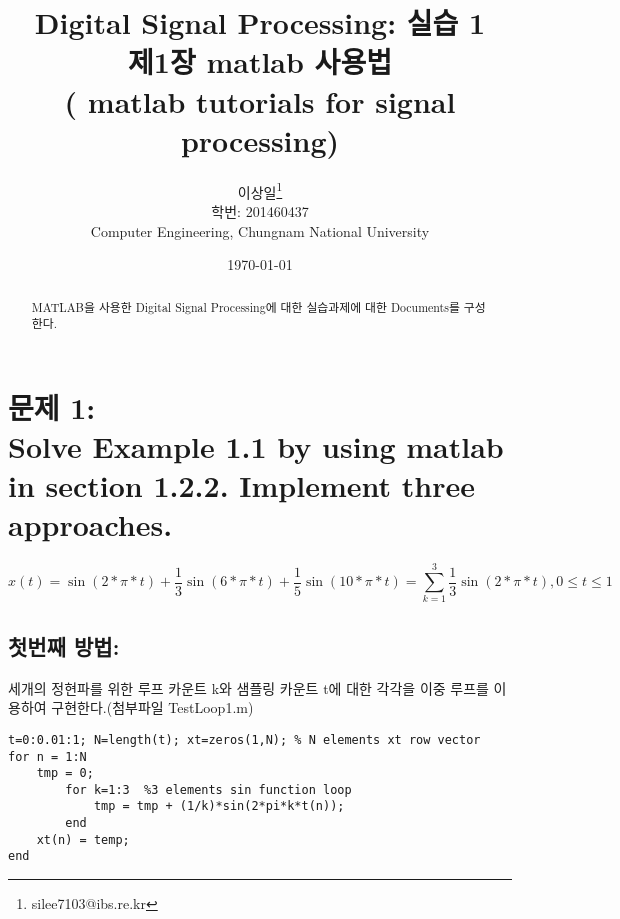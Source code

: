 \documentclass[11pt
  , a4paper
  , article
  , oneside
]{memoir}
\begin{document}
\newcommand{\technumber}{
  Digital Signal Processing using MATLAB\\
  Document 1: 2016-03-19}
\title{\textbf{Digital Signal Processing: 실습 1 \\
		제1장 matlab 사용법 \\ ( matlab tutorials for signal processing)}}

\author{이상일\thanks{silee7103@ibs.re.kr} \\

  학번: 201460437\\
  Computer Engineering, Chungnam National University 
}
\date{\today}

\renewcommand{\maketitlehooka}{\begin{flushright}\textsf{\technumber}\end{flushright}}

\maketitle

\begin{abstract}
MATLAB을 사용한 Digital Signal Processing에 대한 실습과제에 대한 Documents를 구성한다.
\end{abstract}

\chapter{문제 1:\\Solve Example 1.1 by using matlab in section 1.2.2. Implement three approaches.}

\begin {equation}
 x(t) = \sin (2*\pi*t) + \frac{1}{3}\sin(6*\pi*t) + \frac{1}{5}\sin(10*\pi*t) = \displaystyle\sum_{k=1}^{3} \frac{1}{3}\sin(2*\pi*t), 0 \leq t \leq 1
\end {equation}




\section{첫번째 방법: }
세개의 정현파를 위한 루프 카운트 k와 샘플링 카운트 t에 대한 각각을 이중 루프를 이용하여 구현한다.(첨부파일 TestLoop1.m)

\begin{lstlisting}[style=termstyle]
t=0:0.01:1; N=length(t); xt=zeros(1,N); % N elements xt row vector
for n = 1:N
	tmp = 0;
		for k=1:3  %3 elements sin function loop
			tmp = tmp + (1/k)*sin(2*pi*k*t(n));
		end
	xt(n) = temp;
end
\end{lstlisting}
\clearpage
\end{document}
